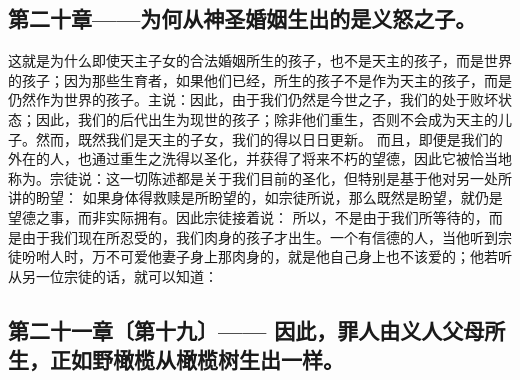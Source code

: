 
\subsection{第二十章——为何从神圣婚姻生出的是义怒之子。}

这就是为什么即使天主子女的合法婚姻所生的孩子，也不是天主的孩子，而是世界的孩子；因为那些生育者，如果他们已经，所生的孩子不是作为天主的孩子，而是仍然作为世界的孩子。主说：因此，由于我们仍然是今世之子，我们的处于败坏状态；因此，我们的后代出生为现世的孩子；除非他们重生，否则不会成为天主的儿子。然而，既然我们是天主的子女，我们的得以日日更新。 而且，即便是我们的外在的人，也通过重生之洗得以圣化，并获得了将来不朽的望德，因此它被恰当地称为。宗徒说：这一切陈述都是关于我们目前的圣化，但特别是基于他对另一处所讲的盼望： 如果身体得救赎是所盼望的，如宗徒所说，那么既然是盼望，就仍是望德之事，而非实际拥有。因此宗徒接着说： 所以，不是由于我们所等待的，而是由于我们现在所忍受的，我们肉身的孩子才出生。一个有信德的人，当他听到宗徒吩咐人时，万不可爱他妻子身上那肉身的，就是他自己身上也不该爱的；他若听从另一位宗徒的话，就可以知道：\par


\subsection{第二十一章〔第十九〕—— 因此，罪人由义人父母所生，正如野橄榄从橄榄树生出一样。}

